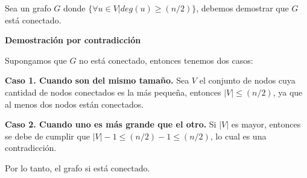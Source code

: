 \documentclass{article}
\begin{document}
Sea un grafo $G$ donde $\{\forall u \in V | deg(u) \geq (n/2) \}$, debemos demostrar
que $G$ está conectado.

\textbf{Demostración por contradicción}

Supongamos que $G$ no está conectado, entonces tenemos dos casos:

\textbf{Caso 1. Cuando son del mismo tamaño.}
Sea $V$ el conjunto de nodos cuya cantidad de nodos conectados es la más
pequeña, entonces $| V | \leq (n/2)$, ya que al menos dos nodos están conectados.

\textbf{Caso 2. Cuando uno es más grande que el otro.}
Si $|V|$ es mayor, entonces se debe de cumplir que $|V|-1 \leq (n/2)-1 \leq
(n/2)$, lo cual es una contradicción.

Por lo tanto, el grafo si está conectado.



% 
% 

\end{document}
